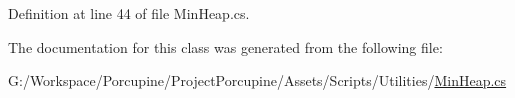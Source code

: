 Definition at line 44 of file Min\+Heap.\+cs.



The documentation for this class was generated from the following file\+:\begin{DoxyCompactItemize}
\item 
G\+:/\+Workspace/\+Porcupine/\+Project\+Porcupine/\+Assets/\+Scripts/\+Utilities/\hyperlink{_min_heap_8cs}{Min\+Heap.\+cs}\end{DoxyCompactItemize}
